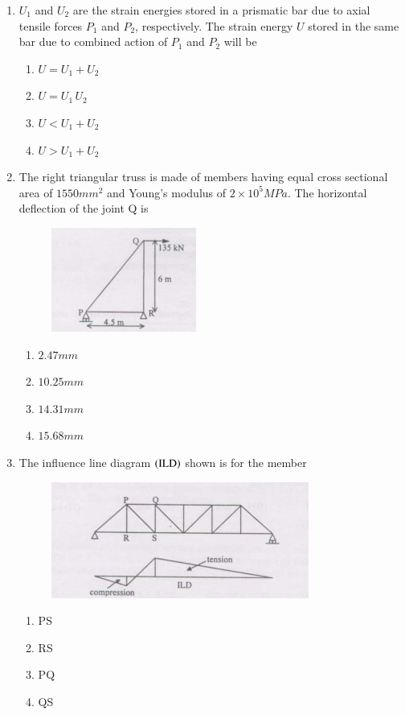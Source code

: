 \documentclass[journal,12pt,onecolumn]{IEEEtran}
\theoremstyle{remark}
\begin{document}
\begin{enumerate}
\item $U_1$ and $U_2$ are the strain energies stored in a prismatic bar due to axial tensile forces $P_1$ and $P_2$, respectively. The strain energy $U$ stored in the same bar due to combined action of $P_1$ and $P_2$ will be

\hfill{}

\begin{enumerate}
\item $U = U_1 + U_2$
\item $U = U_1 \, U_2$
\item $U < U_1 + U_2$
\item $U > U_1 + U_2$
\end{enumerate}

\item The right triangular truss is made of members having equal cross sectional area of $1550 mm^2$ and Young’s modulus of $2\times10^5 MPa$. The horizontal deflection of the joint Q is

\hfill{}
\begin{figure}[H]
\centering
\includegraphics[width=0.3\columnwidth]{figs/q35.png}
\caption*{}
\label{fig:Q.35}
\end{figure}
\begin{enumerate}
\item $2.47 mm$
\item $10.25 mm$
\item $14.31 mm$
\item $15.68 mm$
\end{enumerate}

\item The influence line diagram $\left(\text{ILD}\right)$ shown is for the member

\hfill{}
\begin{figure}[H]
\centering
\includegraphics[width=0.4\columnwidth]{figs/q36.png}
\caption*{}
\label{fig:Q.36}
\end{figure}
\begin{enumerate}
\item PS
\item RS
\item PQ
\item QS
\end{enumerate}


\end{enumerate}
\end{document}
